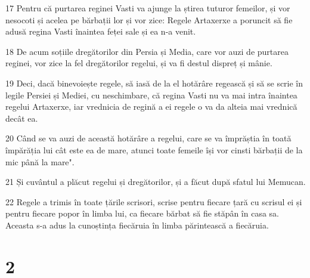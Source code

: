 \par 17 Pentru că purtarea reginei Vasti va ajunge la știrea tuturor femeilor, și vor nesocoti și acelea pe bărbații lor și vor zice: Regele Artaxerxe a poruncit să fie adusă regina Vasti înaintea feței sale și ea n-a venit.
\par 18 De acum soțiile dregătorilor din Persia și Media, care vor auzi de purtarea reginei, vor zice la fel dregătorilor regelui, și va fi destul dispreț și mânie.
\par 19 Deci, dacă binevoiește regele, să iasă de la el hotărâre regească și să se scrie în legile Persiei și Mediei, cu neschimbare, că regina Vasti nu va mai intra înaintea regelui Artaxerxe, iar vrednicia de regină a ei regele o va da alteia mai vrednică decât ea.
\par 20 Când se va auzi de această hotărâre a regelui, care se va împrăștia în toată împărăția lui cât este ea de mare, atunci toate femeile își vor cinsti bărbații de la mic până la mare".
\par 21 Și cuvântul a plăcut regelui și dregătorilor, și a făcut după sfatul lui Memucan.
\par 22 Regele a trimis în toate țările scrisori, scrise pentru fiecare țară cu scrisul ei și pentru fiecare popor în limba lui, ca fiecare bărbat să fie stăpân în casa sa. Aceasta s-a adus la cunoștința fiecăruia în limba părintească a fiecăruia.

\chapter{2}

